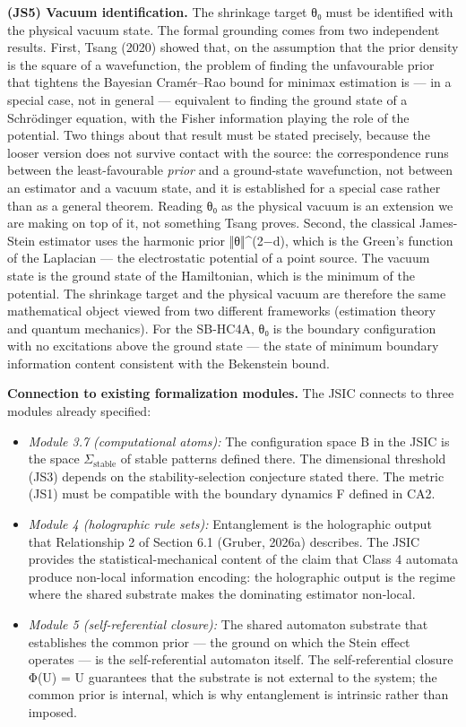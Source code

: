 \documentclass[
]{article}
\providecommand{\tightlist}{%
  \setlength{\itemsep}{0pt}\setlength{\parskip}{0pt}}
\begin{document}
\textbf{(JS5) Vacuum identification.} The shrinkage target θ₀ must be
identified with the physical vacuum state. The formal grounding comes
from two independent results. First, Tsang (2020) showed that, on the
assumption that the prior density is the square of a wavefunction, the
problem of finding the unfavourable prior that tightens the Bayesian
Cramér--Rao bound for minimax estimation is --- in a special case, not
in general --- equivalent to finding the ground state of a Schrödinger
equation, with the Fisher information playing the role of the potential.
Two things about that result must be stated precisely, because the
looser version does not survive contact with the source: the
correspondence runs between the least-favourable \emph{prior} and a
ground-state wavefunction, not between an estimator and a vacuum state,
and it is established for a special case rather than as a general
theorem. Reading θ₀ as the physical vacuum is an extension we are making
on top of it, not something Tsang proves. Second, the classical
James-Stein estimator uses the harmonic prior ‖θ‖\^{}(2−d), which is the
Green's function of the Laplacian --- the electrostatic potential of a
point source. The vacuum state is the ground state of the Hamiltonian,
which is the minimum of the potential. The shrinkage target and the
physical vacuum are therefore the same mathematical object viewed from
two different frameworks (estimation theory and quantum mechanics). For
the SB-HC4A, θ₀ is the boundary configuration with no excitations above
the ground state --- the state of minimum boundary information content
consistent with the Bekenstein bound.

\textbf{Connection to existing formalization modules.} The JSIC connects
to three modules already specified:

\begin{itemize}
\tightlist
\item
  \emph{Module 3.7 (computational atoms):} The configuration space B in
  the JSIC is the space \(\Sigma_{\mathrm{stable}}\) of stable patterns
  defined there. The dimensional threshold (JS3) depends on the
  stability-selection conjecture stated there. The metric (JS1) must be
  compatible with the boundary dynamics F defined in CA2.
\item
  \emph{Module 4 (holographic rule sets):} Entanglement is the
  holographic output that Relationship 2 of Section 6.1 (Gruber, 2026a)
  describes. The JSIC provides the statistical-mechanical content of the
  claim that Class 4 automata produce non-local information encoding:
  the holographic output is the regime where the shared substrate makes
  the dominating estimator non-local.
\item
  \emph{Module 5 (self-referential closure):} The shared automaton
  substrate that establishes the common prior --- the ground on which
  the Stein effect operates --- is the self-referential automaton
  itself. The self-referential closure Φ(U) = U guarantees that the
  substrate is not external to the system; the common prior is internal,
  which is why entanglement is intrinsic rather than imposed.
\end{itemize}
\end{document}

